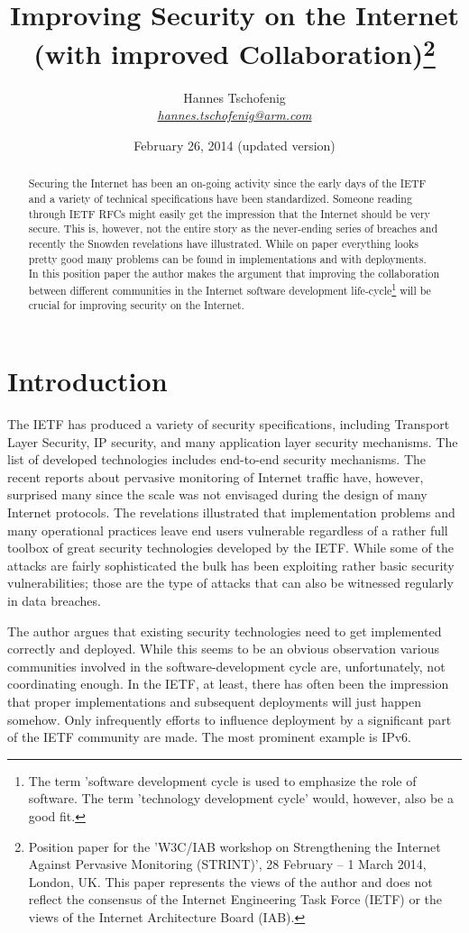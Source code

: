 \documentclass[peerreview, a4paper, 7pt]{IEEEtran}
\title{Improving Security on the Internet \\ \vspace{2 mm} {\large (with improved Collaboration)}\thanks{Position paper for the 'W3C/IAB workshop on Strengthening the Internet Against Pervasive Monitoring (STRINT)', 28 February – 1 March 2014, London, UK. This paper represents the views of the author and does not reflect the consensus of the Internet Engineering Task Force (IETF) or the views of the Internet Architecture Board (IAB).}}
\author{Hannes Tschofenig\\\textit{\href{mailto:hannes.tschofenig@arm.com}{hannes.tschofenig@arm.com}}}
\date{February 26, 2014 (updated version)}
\begin{document}
\maketitle


\begin{abstract}

Securing the Internet has been an on-going activity since the early days of the IETF and a variety of technical specifications have been standardized. 
Someone reading through IETF RFCs might easily get the impression that the Internet should be very secure. This is, however, not the entire story as the never-ending series of breaches and recently the Snowden revelations have illustrated. While on paper everything looks pretty good many problems can be found in implementations and with deployments.\\

In this position paper the author makes the argument that improving the collaboration between different communities in the Internet software development life-cycle\footnote{The term 'software development cycle is used to emphasize the role of software. The term 'technology development cycle' would, however, also be a good fit.} will be crucial for improving security on the Internet. 

\end{abstract}

\section{Introduction}

The IETF has produced a variety of security specifications, including Transport Layer Security, IP security, and many application layer security mechanisms. The list of developed technologies includes end-to-end security mechanisms. The recent reports about pervasive monitoring of Internet traffic have, however, surprised many since the scale was not envisaged during the design of many Internet protocols. The revelations illustrated that implementation problems and many operational practices leave end users vulnerable regardless of a rather full toolbox of great security technologies developed by the IETF. While some of the attacks are fairly sophisticated the bulk has been exploiting rather basic security vulnerabilities; those are the type of attacks that can also be witnessed regularly in data breaches.

The author argues that existing security technologies need to get implemented correctly and deployed. While this seems to be an obvious observation various communities involved in the software-development cycle are, unfortunately, not coordinating enough. In the IETF, at least, there has often been the impression that proper implementations and subsequent deployments will just happen somehow. Only infrequently efforts to influence deployment by a significant part of the IETF community are made. The most prominent example is IPv6. 
\end{document}
